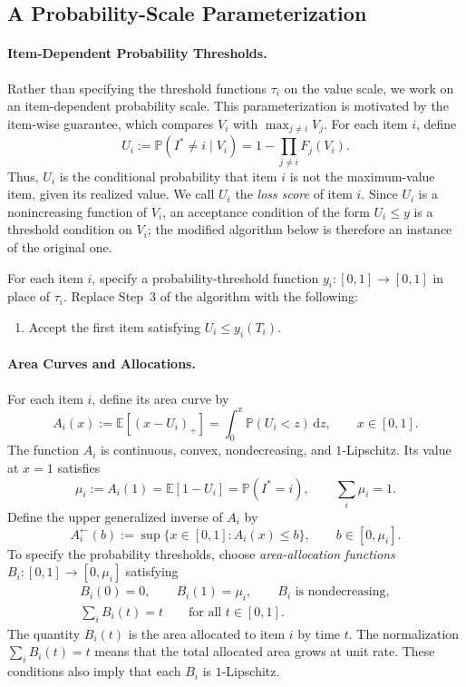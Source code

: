 \documentclass[11pt]{article}
\theoremstyle{definition}
\theoremstyle{remark}
\newcommand{\Pp}{\mathbb P}
\newcommand{\E}{\mathbb E}
\newcommand{\dd}{\,\mathrm d}
\begin{document}
\subsection{A Probability-Scale Parameterization}

\paragraph{Item-Dependent Probability Thresholds.}
Rather than specifying the threshold functions $\tau_i$ on the value scale, we work on an item-dependent probability scale.
This parameterization is motivated by the item-wise guarantee, which compares $V_i$ with $\max_{j\ne i}V_j$.
For each item $i$, define
\[
 U_i:=\Pp(I^*\ne i\mid V_i)
     =1-\prod_{j\ne i}F_j(V_i).
\]
Thus, $U_i$ is the conditional probability that item $i$ is not the maximum-value item, given its realized value.
We call $U_i$ the \emph{loss score} of item $i$.
Since $U_i$ is a nonincreasing function of $V_i$, an acceptance condition of the form $U_i\le y$ is a threshold condition on $V_i$; the modified algorithm below is therefore an instance of the original one.

\begin{tcolorbox}
For each item $i$, specify a probability-threshold function $y_i:[0,1]\to[0,1]$ in place of $\tau_i$.
Replace Step~3 of the algorithm with the following:
\begin{enumerate}
\item[3.] Accept the first item satisfying $U_i\le y_i(T_i)$.
\end{enumerate}
\end{tcolorbox}

\paragraph{Area Curves and Allocations.}
For each item $i$, define its area curve by
\begin{equation}\label{eq:area}
 A_i(x):=\E[(x-U_i)_+]
        =\int_0^x\Pp(U_i<z)\dd z,
 \qquad x\in[0,1].
\end{equation}
The function $A_i$ is continuous, convex, nondecreasing, and $1$-Lipschitz.
Its value at $x=1$ satisfies
\begin{equation}\label{eq:mu}
 \mu_i:=A_i(1)=\E[1-U_i]=\Pp(I^*=i),
 \qquad \sum_i\mu_i=1.
\end{equation}
Define the upper generalized inverse of $A_i$ by
\[
 A_i^{\leftarrow}(b)
 :=\sup\{x\in[0,1]:A_i(x)\le b\},
 \qquad b\in[0,\mu_i].
\]
To specify the probability thresholds, choose \emph{area-allocation functions} $B_i:[0,1]\to[0,\mu_i]$ satisfying
\begin{equation}\label{eq:allocation}
\begin{gathered}
 B_i(0)=0,\qquad B_i(1)=\mu_i,\qquad
 B_i\text{ is nondecreasing},\\
 \sum_i B_i(t)=t\qquad\text{for all $t\in[0,1]$}.
\end{gathered}
\end{equation}
The quantity $B_i(t)$ is the area allocated to item $i$ by time $t$.
The normalization $\sum_i B_i(t)=t$ means that the total allocated area grows at unit rate.
These conditions also imply that each $B_i$ is $1$-Lipschitz.
\end{document}
